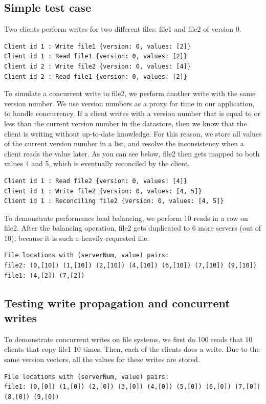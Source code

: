 \documentclass[twoside]{article}
\begin{document}
\begin{multicols}{2}
\subsection{Simple test case}
Two clients perform writes for two different files: file1 and file2 of version 0. 
\begin{lstlisting}
Client id 1 : Write file1 {version: 0, values: [2]}
Client id 1 : Read file1 {version: 0, values: [2]}
Client id 2 : Write file2 {version: 0, values: [4]}
Client id 2 : Read file1 {version: 0, values: [2]}
\end{lstlisting}
To simulate a concurrent write to file2, we perform another write with the same version number. We use version numbers as a proxy for time in our application, to handle concurrency. If a client writes with a version number that is equal to or less than the current version number in the datastore, then we know that the client is writing without up-to-date knowledge. For this reason, we store all values of the current version number in a list, and resolve the inconsistency when a client reads the value later. As you can see below, file2 then gets mapped to both values 4 and 5, which is eventually reconciled by the client.
\begin{lstlisting}
Client id 1 : Read file2 {version: 0, values: [4]}
Client id 1 : Write file2 {version: 0, values: [4, 5]}
Client id 1 : Reconciling file2 {version: 0, values: [4, 5]}
\end{lstlisting}
To demonstrate performance load balancing, we perform 10 reads in a row on file2. After the balancing operation, file2 gets duplicated to 6 more servers (out of 10), because it is such a heavily-requested file. 
\begin{lstlisting}
File locations with (serverNum, value) pairs:
file2: (0,[10]) (1,[10]) (2,[10]) (4,[10]) (6,[10]) (7,[10]) (9,[10])
file1: (4,[2]) (7,[2])
\end{lstlisting}

\subsection{Testing write propagation and concurrent writes}
To demonstrate concurrent writes on file systems, we first do 100 reads that 10 clients that copy file1 10 times. Then, each of the clients does a write. Due to the same version vectors, all the values for these writes are stored.  
\begin{lstlisting}
File locations with (serverNum, value) pairs:
file1: (0,[0]) (1,[0]) (2,[0]) (3,[0]) (4,[0]) (5,[0]) (6,[0]) (7,[0]) (8,[0]) (9,[0])


\end{lstlisting}
\end{multicols}
\end{document}
